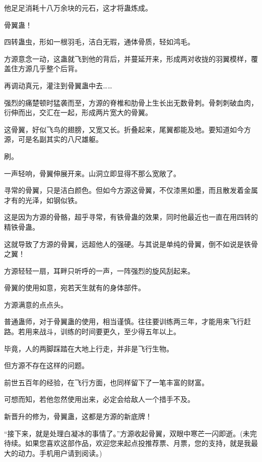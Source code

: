 \begin{this_body}
他足足消耗十八万余块的元石，这才将蛊炼成。

骨翼蛊！

四转蛊虫，形如一根羽毛，洁白无瑕，通体骨质，轻如鸿毛。

方源意念一动，这蛊就飞到他的背后，并蔓延开来，形成两对收拢的羽翼模样，覆盖住方源几乎整个后背。

再调动真元，灌注到骨翼蛊中去……

强烈的痛楚顿时猛袭而至，方源的脊椎和肋骨上生长出无数骨刺。骨刺刺破血肉，衍伸而出，交汇在一起，形成两片宽大的骨翼。

这骨翼，好似飞鸟的翅膀，又宽又长。折叠起来，尾翼都能及地。要知道如今方源，可是名副其实的八尺雄躯。

刷。

一声轻响，骨翼伸展开来。山洞立即显得不那么宽敞了。

寻常的骨翼，只是洁白颜色。但如今方源这骨翼，不仅漆黑如墨，而且散发着金属才有的光泽，如钢似铁。

这是因为方源的骨骼，超乎寻常，有铁骨蛊的效果，同时他最近也一直在用四转的精铁骨蛊。

这就导致了方源的骨翼，远超他人的强硬。与其说是单纯的骨翼，倒不如说是铁骨之翼！

方源轻轻一扇，耳畔只听呼的一声，一阵强烈的旋风刮起来。

骨翼的使用如意，宛若天生就有的身体部件。

方源满意的点点头。

普通蛊师，对于骨翼蛊的使用，相当谨慎。往往要训练两三年，才能用来飞行赶路。若用来战斗，训练的时间要更久，至少得五年以上。

毕竟，人的两脚踩踏在大地上行走，并非是飞行生物。

但方源不存在这样的问题。

前世五百年的经验，在飞行方面，也同样留下了一笔丰富的财富。

可想而知，若他忽然使用出来，必定会给敌人一个措手不及。

新晋升的修为，骨翼蛊，这都是方源的新底牌！

“接下来，就是处理白凝冰的事情了。”方源收起骨翼，双眼中寒芒一闪即逝。(未完待续。如果您喜欢这部作品，欢迎您来起点投推荐票、月票，您的支持，就是我最大的动力。手机用户请到阅读。)

\end{this_body}

